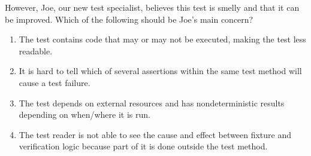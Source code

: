 \begin{Shaded}
\begin{Highlighting}[]
  \NormalTok{() \{}
 
  \NormalTok{);}
  \NormalTok{(}\NormalTok{);}
  \NormalTok{);}
\NormalTok{(}\NormalTok{);}
  \NormalTok{();    }
  \NormalTok{;}
\NormalTok{();}
  \NormalTok{();}
\NormalTok{\}}
\end{Highlighting}
\end{Shaded}

However, Joe, our new test specialist, believes this test is smelly and
that it can be improved. Which of the following should be Joe's main
concern?

\begin{enumerate}
\def\labelenumi{\arabic{enumi}.}
\tightlist
\item
  The test contains code that may or may not be executed, making the
  test less readable.
\item
  It is hard to tell which of several assertions within the same test
  method will cause a test failure.
\item
  The test depends on external resources and has nondeterministic
  results depending on when/where it is run.
\item
  The test reader is not able to see the cause and effect between
  fixture and verification logic because part of it is done outside the
  test method.
\end{enumerate}

